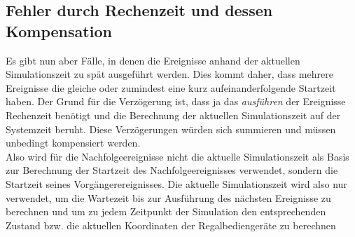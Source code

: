 \subsection{Fehler durch Rechenzeit und dessen Kompensation}
Es gibt nun aber Fälle, in denen die Ereignisse anhand der aktuellen Simulationszeit zu spät ausgeführt werden. Dies kommt daher, dass mehrere Ereignisse die gleiche oder zumindest eine kurz aufeinanderfolgende Startzeit haben. Der Grund für die Verzögerung ist, dass ja das \textit{ausführen} der Ereignisse Rechenzeit benötigt und die Berechnung der aktuellen Simulationszeit auf der Systemzeit beruht. Diese Verzögerungen würden sich summieren und müssen unbedingt kompensiert werden.\\
Also wird für die Nachfolgeereignisse nicht die aktuelle Simulationszeit als Basis zur Berechnung der Startzeit des Nachfolgeereignisses verwendet, sondern die Startzeit seines Vorgängerereignisses. Die aktuelle Simulationszeit wird also nur verwendet, um die Wartezeit bis zur Ausführung des nächsten Ereignisse zu berechnen und um zu jedem Zeitpunkt der Simulation den entsprechenden Zustand bzw. die aktuellen Koordinaten der Regalbediengeräte zu berechnen
%
